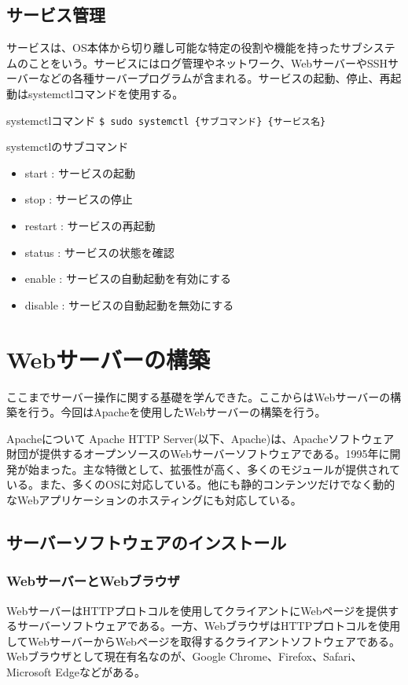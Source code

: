 \documentclass[a4paper, 11pt, dvipdfmx]{jsarticle}
\begin{document}
\subsection{サービス管理}
  サービスは、OS本体から切り離し可能な特定の役割や機能を持ったサブシステムのことをいう。サービスにはログ管理やネットワーク、WebサーバーやSSHサーバーなどの各種サーバープログラムが含まれる。サービスの起動、停止、再起動はsystemctlコマンドを使用する。
  \begin{commandbox}{systemctlコマンド}
    \verb|$ sudo systemctl {サブコマンド} {サービス名}|
  \end{commandbox}
  \begin{hosokubox}{systemctlのサブコマンド}
    \begin{itemize}
      \item start : サービスの起動
      \item stop : サービスの停止
      \item restart : サービスの再起動
      \item status : サービスの状態を確認
      \item enable : サービスの自動起動を有効にする
      \item disable : サービスの自動起動を無効にする
    \end{itemize}
  \end{hosokubox}
\section{Webサーバーの構築}
ここまでサーバー操作に関する基礎を学んできた。ここからはWebサーバーの構築を行う。今回はApacheを使用したWebサーバーの構築を行う。
\begin{johobox}{Apacheについて}
  Apache HTTP Server(以下、Apache)は、Apacheソフトウェア財団が提供するオープンソースのWebサーバーソフトウェアである。1995年に開発が始まった。主な特徴として、拡張性が高く、多くのモジュールが提供されている。また、多くのOSに対応している。他にも静的コンテンツだけでなく動的なWebアプリケーションのホスティングにも対応している。
\end{johobox}
\subsection{サーバーソフトウェアのインストール}
\subsubsection{WebサーバーとWebブラウザ}
WebサーバーはHTTPプロトコルを使用してクライアントにWebページを提供するサーバーソフトウェアである。一方、WebブラウザはHTTPプロトコルを使用してWebサーバーからWebページを取得するクライアントソフトウェアである。Webブラウザとして現在有名なのが、Google Chrome、Firefox、Safari、Microsoft Edgeなどがある。
\end{document}
